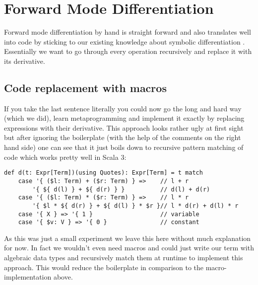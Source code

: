 \section{Forward Mode Differentiation}

Forward mode differentiation by hand is straight forward and also translates well into code by sticking to our existing knowledge about symbolic differentiation . Essentially we want to go through every operation recursively and replace it with its derivative.


\subsection{Code replacement with macros}
If you take the last sentence literally you could now go the long and hard way (which we did), learn metaprogramming and implement it exactly by replacing expressions with their derivative. This approach looks rather ugly at first sight but after ignoring the boilerplate (with the help of the comments on the right hand side) one can see that it just boils down to recursive pattern matching of code which works pretty well in Scala 3:
\begin{lstlisting}
def d(t: Expr[Term])(using Quotes): Expr[Term] = t match
    case '{ ($l: Term) + ($r: Term) } =>    // l + r
        '{ ${ d(l) } + ${ d(r) } }          // d(l) + d(r)
    case '{ ($l: Term) * ($r: Term) } =>    // l * r
        '{ $l * ${ d(r) } + ${ d(l) } * $r }// l * d(r) + d(l) * r
    case '{ X } => '{ 1 }                   // variable
    case '{ $v: V } => '{ 0 }               // constant
\end{lstlisting}
As this was just a small experiment we leave this here without much explanation for now.  In fact we wouldn't even need macros and could just write our term with algebraic data types and recursively match them at runtime to implement this approach. This would reduce the boilerplate in comparison to the macro-implementation above.


